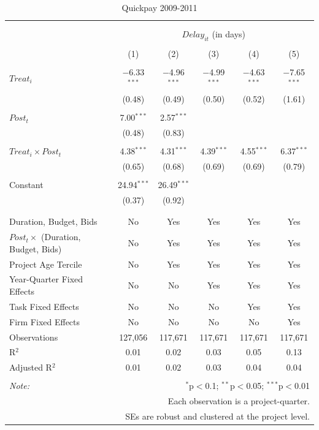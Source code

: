 \documentclass[
]{article}
\begin{document}
\begin{table}[H] \centering 
  \caption{Quickpay 2009-2011} 
  \label{} 
\small 
\begin{tabular}{@{\extracolsep{-2pt}}lccccc} 
\\[-1.8ex]\hline 
\hline \\[-1.8ex] 
\\[-1.8ex] & \multicolumn{5}{c}{$Delay_{it}$ (in days)} \\ 
\\[-1.8ex] & (1) & (2) & (3) & (4) & (5)\\ 
\hline \\[-1.8ex] 
 $Treat_i$ & $-$6.33$^{***}$ & $-$4.96$^{***}$ & $-$4.99$^{***}$ & $-$4.63$^{***}$ & $-$7.65$^{***}$ \\ 
  & (0.48) & (0.49) & (0.50) & (0.52) & (1.61) \\ 
  & & & & & \\ 
 $Post_t$ & 7.00$^{***}$ & 2.57$^{***}$ &  &  &  \\ 
  & (0.48) & (0.83) &  &  &  \\ 
  & & & & & \\ 
 $Treat_i \times Post_t$ & 4.38$^{***}$ & 4.31$^{***}$ & 4.39$^{***}$ & 4.55$^{***}$ & 6.37$^{***}$ \\ 
  & (0.65) & (0.68) & (0.69) & (0.69) & (0.79) \\ 
  & & & & & \\ 
 Constant & 24.94$^{***}$ & 26.49$^{***}$ &  &  &  \\ 
  & (0.37) & (0.92) &  &  &  \\ 
  & & & & & \\ 
\hline \\[-1.8ex] 
Duration, Budget, Bids & No & Yes & Yes & Yes & Yes \\ 
$Post_t \times$  (Duration, Budget, Bids) & No & Yes & Yes & Yes & Yes \\ 
Project Age Tercile & No & Yes & Yes & Yes & Yes \\ 
Year-Quarter Fixed Effects & No & No & Yes & Yes & Yes \\ 
Task Fixed Effects & No & No & No & Yes & Yes \\ 
Firm Fixed Effects & No & No & No & No & Yes \\ 
Observations & 127,056 & 117,671 & 117,671 & 117,671 & 117,671 \\ 
R$^{2}$ & 0.01 & 0.02 & 0.03 & 0.05 & 0.13 \\ 
Adjusted R$^{2}$ & 0.01 & 0.02 & 0.03 & 0.04 & 0.04 \\ 
\hline 
\hline \\[-1.8ex] 
\textit{Note:}  & \multicolumn{5}{r}{$^{*}$p$<$0.1; $^{**}$p$<$0.05; $^{***}$p$<$0.01} \\ 
 & \multicolumn{5}{r}{Each observation is a project-quarter.} \\ 
 & \multicolumn{5}{r}{SEs are robust and clustered at the project level.} \\ 
\end{tabular} 
\end{table}
\end{document}
